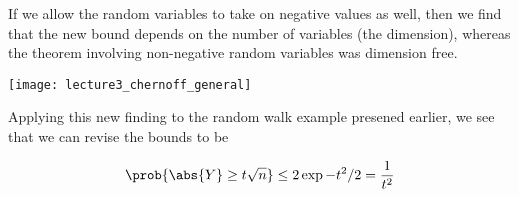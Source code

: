 \documentclass[../main.tex]{subfiles}
\begin{document}
\begin{remark}
    If we allow the random variables to take on negative values as well, then we find that
    the new bound depends on the number of variables (the dimension), whereas the theorem
    involving non-negative random variables was dimension free.

    \begin{center}
        \texttt{[image: lecture3\_chernoff\_general]}
    \end{center}


    Applying this new finding to the random walk example presened earlier, we see that
    we can revise the bounds to be

    \begin{align*}
        \prob{\abs{Y} \geq t\sqrt{n}} \leq 2 \exp{-t^2/2} = \frac{1}{t^2} \\
    \end{align*}

\end{remark}
\end{document}
